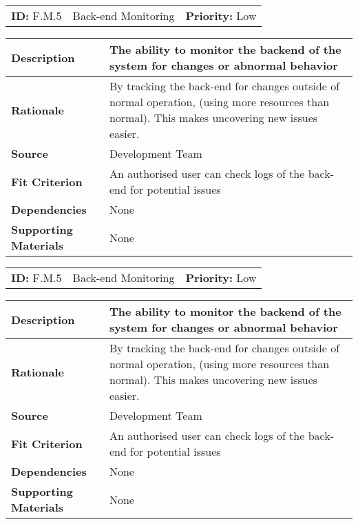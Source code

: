 \begin{table}[H]
    \begin{tabularx}{\textwidth}{| l | X | l |}
        \hline
        \textbf{ID:} F.M.5 & Back-end Monitoring & \textbf{Priority:} Low \\
    \end{tabularx}
    \begin{tabularx}{\textwidth}{| l | X |}
        \hline
        \textbf{Description} & The ability to monitor the backend of the system for changes or abnormal behavior\\ \hline
        \textbf{Rationale} & By tracking the back-end for changes outside of normal operation, (using more resources than normal). This makes uncovering new issues easier.\\ \hline
        \textbf{Source} &  Development Team\\ \hline
        \textbf{Fit Criterion} & An authorised user can check logs of the back-end for potential issues \\ \hline
        \textbf{Dependencies} & None \\ \hline
        \textbf{Supporting Materials} & None \\ \hline
    \end{tabularx}
\end{table}

\begin{table}[H]
    \begin{tabularx}{\textwidth}{| l | X | l |}
        \hline
        \textbf{ID:} F.M.5 & Back-end Monitoring & \textbf{Priority:} Low \\
    \end{tabularx}
    \begin{tabularx}{\textwidth}{| l | X |}
        \hline
        \textbf{Description} & The ability to monitor the backend of the system for changes or abnormal behavior\\ \hline
        \textbf{Rationale} & By tracking the back-end for changes outside of normal operation, (using more resources than normal). This makes uncovering new issues easier.\\ \hline
        \textbf{Source} &  Development Team\\ \hline
        \textbf{Fit Criterion} & An authorised user can check logs of the back-end for potential issues \\ \hline
        \textbf{Dependencies} & None \\ \hline
        \textbf{Supporting Materials} & None \\ \hline
    \end{tabularx}
\end{table}

